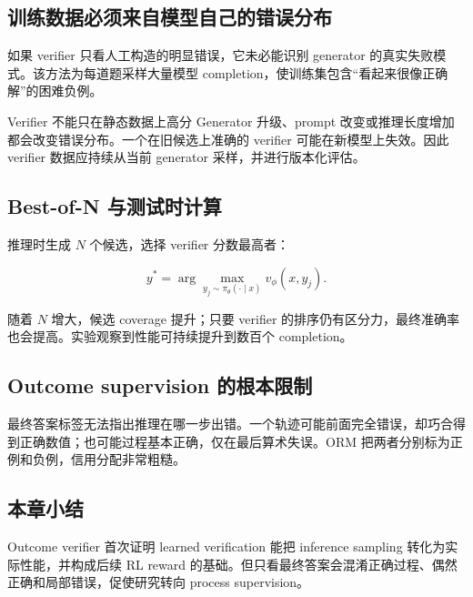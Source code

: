 \subsection{训练数据必须来自模型自己的错误分布}

如果 verifier 只看人工构造的明显错误，它未必能识别 generator 的真实失败模式。该方法为每道题采样大量模型 completion，使训练集包含“看起来很像正确解”的困难负例。

\begin{warningbox}{Verifier 不能只在静态数据上高分}
Generator 升级、prompt 改变或推理长度增加都会改变错误分布。一个在旧候选上准确的 verifier 可能在新模型上失效。因此 verifier 数据应持续从当前 generator 采样，并进行版本化评估。
\end{warningbox}

\subsection{Best-of-N 与测试时计算}

推理时生成 $N$ 个候选，选择 verifier 分数最高者：

$$
y^*=\arg\max_{y_j\sim\pi_\theta(\cdot\mid x)} v_\phi(x,y_j).
$$

随着 $N$ 增大，候选 coverage 提升；只要 verifier 的排序仍有区分力，最终准确率也会提高。实验观察到性能可持续提升到数百个 completion。


\subsection{Outcome supervision 的根本限制}

最终答案标签无法指出推理在哪一步出错。一个轨迹可能前面完全错误，却巧合得到正确数值；也可能过程基本正确，仅在最后算术失误。ORM 把两者分别标为正例和负例，信用分配非常粗糙。

\subsection{本章小结}

Outcome verifier 首次证明 learned verification 能把 inference sampling 转化为实际性能，并构成后续 RL reward 的基础。但只看最终答案会混淆正确过程、偶然正确和局部错误，促使研究转向 process supervision。

